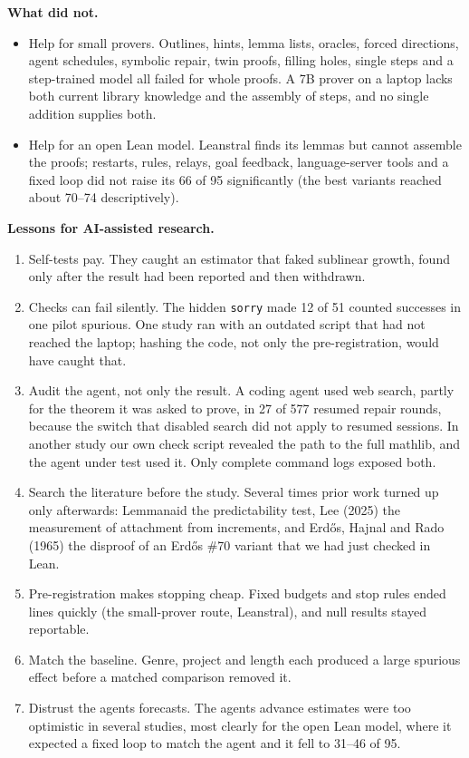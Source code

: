 \documentclass[11pt,a4paper]{article}
\providecommand{\tightlist}{\setlength{\itemsep}{0pt}\setlength{\parskip}{0pt}}
\begin{document}
\textbf{What did not.}

\begin{itemize}
\tightlist
\item
  Help for small provers. Outlines, hints, lemma lists, oracles, forced directions, agent schedules, symbolic repair, twin proofs, filling holes, single steps and a step-trained model all failed for whole proofs. A 7B prover on a laptop lacks both current library knowledge and the assembly of steps, and no single addition supplies both.
\item
  Help for an open Lean model. Leanstral finds its lemmas but cannot assemble the proofs; restarts, rules, relays, goal feedback, language-server tools and a fixed loop did not raise its 66 of 95 significantly (the best variants reached about 70--74 descriptively).
\end{itemize}

\textbf{Lessons for AI-assisted research.}

\begin{enumerate}
\def\labelenumi{\arabic{enumi}.}
\tightlist
\item
  Self-tests pay. They caught an estimator that faked sublinear growth, found only after the result had been reported and then withdrawn.
\item
  Checks can fail silently. The hidden \texttt{sorry} made 12 of 51 counted successes in one pilot spurious. One study ran with an outdated script that had not reached the laptop; hashing the code, not only the pre-registration, would have caught that.
\item
  Audit the agent, not only the result. A coding agent used web search, partly for the theorem it was asked to prove, in 27 of 577 resumed repair rounds, because the switch that disabled search did not apply to resumed sessions. In another study our own check script revealed the path to the full mathlib, and the agent under test used it. Only complete command logs exposed both.
\item
  Search the literature before the study. Several times prior work turned up only afterwards: Lemmanaid the predictability test, Lee (2025) the measurement of attachment from increments, and Erdős, Hajnal and Rado (1965) the disproof of an Erdős \#70 variant that we had just checked in Lean.
\item
  Pre-registration makes stopping cheap. Fixed budgets and stop rules ended lines quickly (the small-prover route, Leanstral), and null results stayed reportable.
\item
  Match the baseline. Genre, project and length each produced a large spurious effect before a matched comparison removed it.
\item
  Distrust the agent\textquotesingle s forecasts. The agent\textquotesingle s advance estimates were too optimistic in several studies, most clearly for the open Lean model, where it expected a fixed loop to match the agent and it fell to 31--46 of 95.
\end{enumerate}
\end{document}
